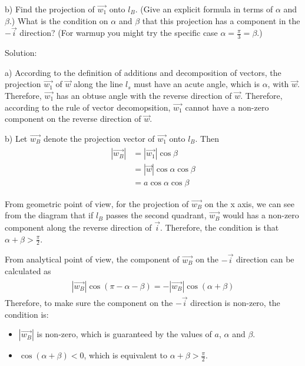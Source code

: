 \documentclass{article}
\begin{document}
b) Find the projection of $\vec{w_{1}}$ onto $l_{B}$. (Give an explicit formula
in terms of $\alpha$ and $\beta$.) What is the condition on $\alpha$ and $\beta$
that this projection has a component in the $-\vec{i}$ direction? (For warmup
you might try the specific case $\alpha = \frac{\pi}{3} = \beta$.)

Solution:

a) According to the definition of additions and decomposition of vectors, the 
projection $\vec{w_1}$ of $\vec{w}$ along the line $l_s$ must have an acute 
angle, which is $\alpha$, with $\vec{w}$. Therefore, $\vec{w_1}$ has an obtuse 
angle with the reverse direction of $\vec{w}$. Therefore, according to the rule 
of vector decomopsition, $\vec{w_1}$ cannot have a non-zero component on the 
reverse direction of $\vec{w}$. 

b) Let $\vec{w_B}$ denote the projection vector of $\vec{w_1}$ onto $l_B$. Then
\begin{gather*}
  \begin{split}
    |\vec{w_B}| &= |\vec{w_1}| \cos\beta \\
                &= |\vec{w}| \cos\alpha \cos\beta \\
                &= a \cos\alpha \cos\beta \\
  \end{split} \\
\end{gather*}
From geometric point of view, for the projection of $\vec{w_B}$ on the x axis, 
we can see from the diagram that if $l_B$ passes the second quadrant, 
$\vec{w_B}$ would has a non-zero component along the reverse direction of 
$\vec{i}$. Therefore, the condition is that $\alpha + \beta > \frac{\pi}{2}$.

From analytical point of view, the component of $\vec{w_B}$ on the $-\vec{i}$ 
direction can be calculated as
\begin{gather*}
  \begin{split}
    |\vec{w_B}| \cos(\pi - \alpha - \beta) = -|\vec{w_B}| \cos(\alpha + \beta)
  \end{split}
\end{gather*}
Therefore, to make sure the component on the $-\vec{i}$ direction is non-zero, 
the condition is:
\begin{itemize}
  \item $|\vec{w_B}|$ is non-zero, which is guaranteed by the values of $a$, 
    $\alpha$ and $\beta$.
  \item $\cos(\alpha + \beta) < 0$, which is equivalent to 
    $\alpha + \beta > \frac{\pi}{2}$.
\end{itemize}
\end{document}
